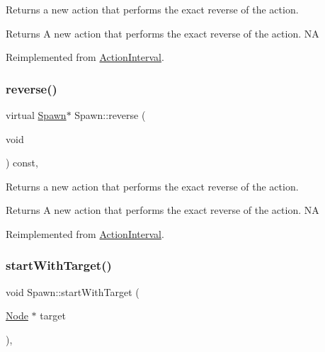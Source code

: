 Returns a new action that performs the exact reverse of the action.

\begin{DoxyReturn}{Returns}
A new action that performs the exact reverse of the action.  NA 
\end{DoxyReturn}


Reimplemented from \hyperlink{classActionInterval_a9f9ac7164036a0bc261a72f62a2b2da7}{Action\+Interval}.

\mbox{\label{classSpawn_a6cf6f6f320f49ca3364a50e873cb9a03}} 
\subsubsection{\texorpdfstring{reverse()}{reverse()}\hspace{0.1cm}{\footnotesize\ttfamily [2/2]}}
{\footnotesize\ttfamily virtual \hyperlink{classSpawn}{Spawn}$\ast$ Spawn\+::reverse (\begin{DoxyParamCaption}\item[{void}]{ }\end{DoxyParamCaption}) const\hspace{0.3cm}{\ttfamily [override]}, {\ttfamily [virtual]}}

Returns a new action that performs the exact reverse of the action.

\begin{DoxyReturn}{Returns}
A new action that performs the exact reverse of the action.  NA 
\end{DoxyReturn}


Reimplemented from \hyperlink{classActionInterval_a9f9ac7164036a0bc261a72f62a2b2da7}{Action\+Interval}.

\mbox{\label{classSpawn_a12784be2d96c07bacacdb92f53c02c70}} 
\subsubsection{\texorpdfstring{start\+With\+Target()}{startWithTarget()}\hspace{0.1cm}{\footnotesize\ttfamily [1/2]}}
{\footnotesize\ttfamily void Spawn\+::start\+With\+Target (\begin{DoxyParamCaption}\item[{\hyperlink{classNode}{Node} $\ast$}]{target }\end{DoxyParamCaption})\hspace{0.3cm}{\ttfamily [override]}, {\ttfamily [virtual]}}


